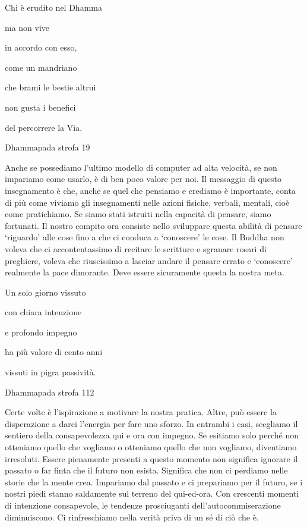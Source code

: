 \documentclass[a4paper,portrait,12pt]{article}
\begin{document}
\newpage



Chi \`{e} erudito nel Dhamma


ma non vive	


in accordo con esso,


come un mandriano


che brami le bestie altrui


non gusta i benefici


del percorrere la Via.





Dhammapada strofa 19


\newpage



Anche se possediamo l'ultimo modello di computer ad alta velocit\`{a}, se non impariamo come usarlo, \`{e} di ben poco valore per noi. Il messaggio di questo insegnamento \`{e} che, anche se quel che pensiamo e crediamo \`{e} importante, conta di più come viviamo gli insegnamenti nelle azioni fisiche, verbali, mentali, cio\`{e} come pratichiamo. Se siamo stati istruiti nella capacit\`{a} di pensare, siamo fortunati. Il nostro compito ora consiste nello sviluppare questa abilit\`{a} di pensare `riguardo' alle cose fino a che ci conduca a `conoscere' le cose. Il Buddha non voleva che ci accontentassimo di recitare le scritture e sgranare rosari di preghiere, voleva che riuscissimo a lasciar andare il pensare errato e `conoscere' realmente la pace dimorante. Deve essere sicuramente questa la nostra meta.


\newpage



	


Un solo giorno vissuto


con chiara intenzione


e profondo impegno


ha più valore di cento anni


vissuti in pigra passivit\`{a}.





Dhammapada strofa 112


\newpage



Certe volte \`{e} l'ispirazione a motivare la nostra pratica. Altre, pu\`{o} essere la disperazione a darci l'energia per fare uno sforzo. In entrambi i casi, scegliamo il sentiero della consapevolezza qui e ora con impegno. Se esitiamo solo perch\'{e} non otteniamo quello che vogliamo o otteniamo quello che non vogliamo, diventiamo irresoluti. Essere pienamente presenti a questo momento non significa ignorare il passato o far finta che il futuro non esista. Significa che non ci perdiamo nelle storie che la mente crea. Impariamo dal passato e ci prepariamo per il futuro, se i nostri piedi stanno saldamente sul terreno del qui-ed-ora. Con crescenti momenti di intenzione consapevole, le tendenze prosciuganti dell'autocommiserazione diminuiscono. Ci rinfreschiamo nella verit\`{a} priva di un s\'{e} di ci\`{o} che \`{e}. 
\end{document}
